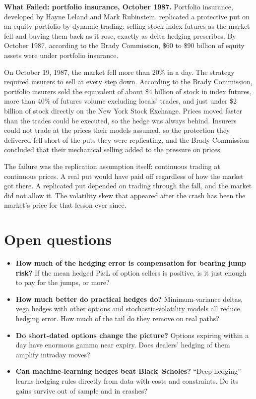 \begin{callout}
\textbf{What Failed: portfolio insurance, October 1987.} Portfolio insurance, developed by Hayne Leland and Mark Rubinstein, replicated a protective put on an equity portfolio by dynamic trading: selling stock-index futures as the market fell and buying them back as it rose, exactly as delta hedging prescribes. By October 1987, according to the Brady Commission, \$60 to \$90 billion of equity assets were under portfolio insurance.

On October 19, 1987, the market fell more than 20\% in a day. The strategy required insurers to sell at every step down. According to the Brady Commission, portfolio insurers sold the equivalent of about \$4 billion of stock in index futures, more than 40\% of futures volume excluding locals' trades, and just under \$2 billion of stock directly on the New York Stock Exchange. Prices moved faster than the trades could be executed, so the hedge was always behind. Insurers could not trade at the prices their models assumed, so the protection they delivered fell short of the puts they were replicating, and the Brady Commission concluded that their mechanical selling added to the pressure on prices.

The failure was the replication assumption itself: continuous trading at continuous prices. A real put would have paid off regardless of how the market got there. A replicated put depended on trading through the fall, and the market did not allow it. The volatility skew that appeared after the crash has been the market's price for that lesson ever since.
\end{callout}

\section{Open questions}
\label{sec:15-open}

\begin{itemize}
  \item \textbf{How much of the hedging error is compensation for bearing jump risk?} If the mean hedged P\&L of option sellers is positive, is it just enough to pay for the jumps, or more?
  \item \textbf{How much better do practical hedges do?} Minimum-variance deltas, vega hedges with other options and stochastic-volatility models all reduce hedging error. How much of the tail do they remove on real paths?
  \item \textbf{Do short-dated options change the picture?} Options expiring within a day have enormous gamma near expiry. Does dealers' hedging of them amplify intraday moves?
  \item \textbf{Can machine-learning hedges beat Black--Scholes?} ``Deep hedging'' learns hedging rules directly from data with costs and constraints. Do its gains survive out of sample and in crashes?
\end{itemize}

